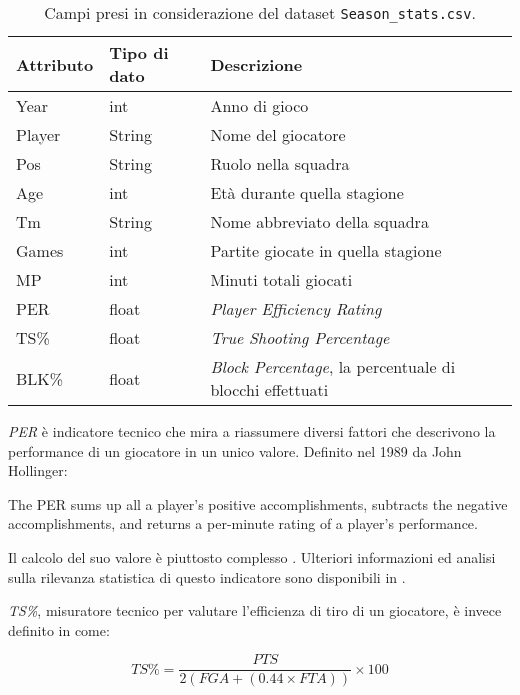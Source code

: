 \begin{center}
	\begin{longtable}[m]{|m{5em} m{7em} m{16em}|} 

		\caption{Campi presi in considerazione del dataset \texttt{Season\_stats.csv}.\label{tabella_seasons_stats}}\\
		\hline
		\bfseries{Attributo} & \bfseries{Tipo di dato} & \bfseries{Descrizione} \\
		\hline

		Year & int & Anno di gioco\\ 
		\hline
		Player & String & Nome del giocatore\\ 
		\hline
		Pos & String & Ruolo nella squadra\\ 
		\hline
		Age & int & Età durante quella stagione\\ 
		\hline
		Tm & String & Nome abbreviato della squadra\\
		\hline
		Games & int & Partite giocate in quella stagione\\ 
		\hline
		MP & int & Minuti totali giocati\\ 
		\hline
		PER & float & \textit{Player Efficiency Rating}\\ 
		\hline
		TS\% & float & \textit{True Shooting Percentage}\\ 
		\hline
		BLK\% & float & \textit{Block Percentage}, la percentuale di blocchi effettuati \\ 
		\hline

	\end{longtable}
\end{center}
\textit{PER} è indicatore tecnico che mira a riassumere diversi fattori che descrivono la performance di un giocatore in un unico valore.
Definito nel 1989 da John Hollinger:
\begin{displayquote}
 The PER sums up all a player's positive accomplishments, subtracts the negative accomplishments, and returns a per-minute rating of a player's performance. 
 \end{displayquote}
Il calcolo del suo valore è piuttosto complesso \cite{BRper}. Ulteriori informazioni ed analisi sulla rilevanza statistica di questo indicatore sono disponibili in \cite{10.1007/978-3-642-22456-0_34}.
\par
\textit{TS\%}, misuratore tecnico per valutare l'efficienza di tiro di un giocatore, è invece definito in \cite{BRglossary} come:

\begin{equation}
TS\% = \frac{PTS}{ 2(FGA + (0.44 \times FTA))}\times100
\end{equation}

